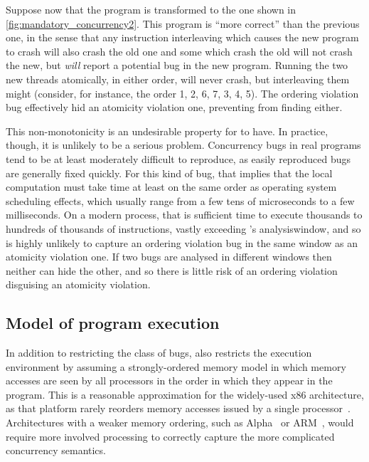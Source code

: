 Suppose now that the program is transformed to the one shown in
\autoref{fig:mandatory_concurrency2}.  This program is ``more
correct'' than the previous one, in the sense that any instruction
interleaving which causes the new program to crash will also crash the
old one and some which crash the old will not crash the new, but
{\technique} \emph{will} report a potential bug in the new program.
Running the two new threads atomically, in either order, will never
crash, but interleaving them might (consider, for instance, the order
1, 2, 6, 7, 3, 4, 5).  The ordering violation bug effectively hid an
atomicity violation one, preventing {\technique} from finding either.

This non-monotonicity is an undesirable property for {\technique} to
have.  In practice, though, it is unlikely to be a serious problem.
Concurrency bugs in real programs tend to be at least moderately
difficult to reproduce, as easily reproduced bugs are generally fixed
quickly.  For this kind of bug, that implies that the local
computation must take time at least on the same order as operating
system scheduling effects, which usually range from a few tens of
microseconds to a few milliseconds.  On a modern process, that is
sufficient time to execute thousands to hundreds of thousands of
instructions, vastly exceeding {\technique}'s \gls{analysiswindow},
and so {\technique} is highly unlikely to capture an ordering
violation bug in the same window as an atomicity violation one.  If
two bugs are analysed in different windows then neither can hide the
other, and so there is little risk of an ordering violation disguising
an atomicity violation.

\subsection{Model of program execution}

In addition to restricting the class of bugs, {\technique} also
restricts the execution environment by assuming a strongly-ordered
memory model in which memory accesses are seen by all processors in
the order in which they appear in the program.  This is a reasonable
approximation for the widely-used x86 architecture, as that platform
rarely reorders memory accesses issued by a single
processor~\cite[Section 8.2]{Intel2009}.  Architectures with a weaker
memory ordering, such as Alpha~\cite[Section 5.6]{FFFCompaq2002} or
ARM~\cite[Section 5.3.4]{FFFARM2007}, would require more involved
processing to correctly capture the more complicated concurrency
semantics.


